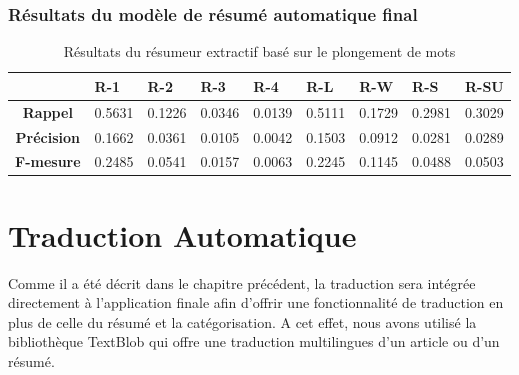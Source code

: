         \subsubsection{Résultats du modèle de résumé automatique final}
        \begin{table}[H]
            \begin{center}
                \begin{tabular}{|c|C{1.2cm}|C{1.2cm}|C{1.2cm}|C{1.2cm}|C{1.2cm}|C{1.2cm}|C{1.2cm}|C{1.2cm}|}
                     & \textbf{R-1} &  \textbf{R-2} &  \textbf{R-3} &  \textbf{R-4} &  \textbf{R-L} &  \textbf{R-W} &  \textbf{R-S} &  \textbf{R-SU} \\
                    \hline
                    \textbf{Rappel} & 0.5631 & 0.1226 & 0.0346 & 0.0139 & 0.5111 & 0.1729 & 0.2981 & 0.3029 \\
                    \textbf{Précision} & 0.1662 & 0.0361 & 0.0105 & 0.0042 & 0.1503 & 0.0912 & 0.0281 & 0.0289 \\
                    \textbf{F-mesure} & 0.2485 & 0.0541 & 0.0157 & 0.0063 & 0.2245 & 0.1145 & 0.0488 & 0.0503 \\
                    \hline
                \end{tabular}
             \end{center}
            \caption{Résultats du résumeur extractif basé sur le plongement de mots}
            \label{result-boltzman}
        \end{table}

\section{Traduction Automatique}
Comme il a été décrit dans le chapitre précédent, la traduction sera intégrée directement à l'application finale afin d'offrir une fonctionnalité de traduction en plus de celle du résumé et la catégorisation. A cet effet, nous avons utilisé la bibliothèque TextBlob qui offre une traduction multilingues d'un article ou d'un résumé.
